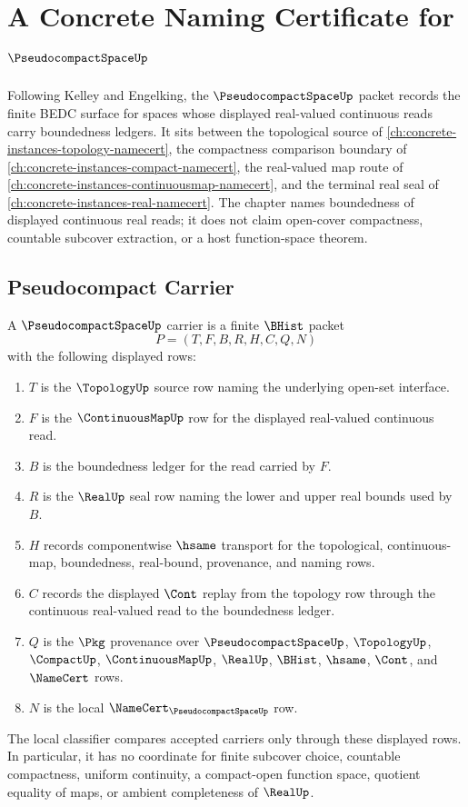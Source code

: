 \chapter{A Concrete Naming Certificate for $\PseudocompactSpaceUp$}
\label{ch:concrete-instances-pseudocompact-space-namecert}

Following Kelley and Engelking, the $\PseudocompactSpaceUp$ packet records the finite BEDC surface for spaces whose displayed real-valued continuous reads carry boundedness ledgers. It sits between the topological source of \autoref{ch:concrete-instances-topology-namecert}, the compactness comparison boundary of \autoref{ch:concrete-instances-compact-namecert}, the real-valued map route of \autoref{ch:concrete-instances-continuousmap-namecert}, and the terminal real seal of \autoref{ch:concrete-instances-real-namecert}. The chapter names boundedness of displayed continuous real reads; it does not claim open-cover compactness, countable subcover extraction, or a host function-space theorem.

\section{Pseudocompact Carrier}
\label{sec:pseudocompact-space-carrier}

\begin{definition}
\label{def:pseudocompact-space-carrier}
A $\PseudocompactSpaceUp$ carrier is a finite $\BHist$ packet
$$
P=(T,F,B,R,H,C,Q,N)
$$
with the following displayed rows:
\begin{enumerate}
\item $T$ is the $\TopologyUp$ source row naming the underlying open-set interface.
\item $F$ is the $\ContinuousMapUp$ row for the displayed real-valued continuous read.
\item $B$ is the boundedness ledger for the read carried by $F$.
\item $R$ is the $\RealUp$ seal row naming the lower and upper real bounds used by $B$.
\item $H$ records componentwise $\hsame$ transport for the topological, continuous-map, boundedness, real-bound, provenance, and naming rows.
\item $C$ records the displayed $\Cont$ replay from the topology row through the continuous real-valued read to the boundedness ledger.
\item $Q$ is the $\Pkg$ provenance over $\PseudocompactSpaceUp$, $\TopologyUp$, $\CompactUp$, $\ContinuousMapUp$, $\RealUp$, $\BHist$, $\hsame$, $\Cont$, and $\NameCert$ rows.
\item $N$ is the local $\NameCert_{\PseudocompactSpaceUp}$ row.
\end{enumerate}
The local classifier compares accepted carriers only through these displayed rows. In particular, it has no coordinate for finite subcover choice, countable compactness, uniform continuity, a compact-open function space, quotient equality of maps, or ambient completeness of $\RealUp$.
\end{definition}

